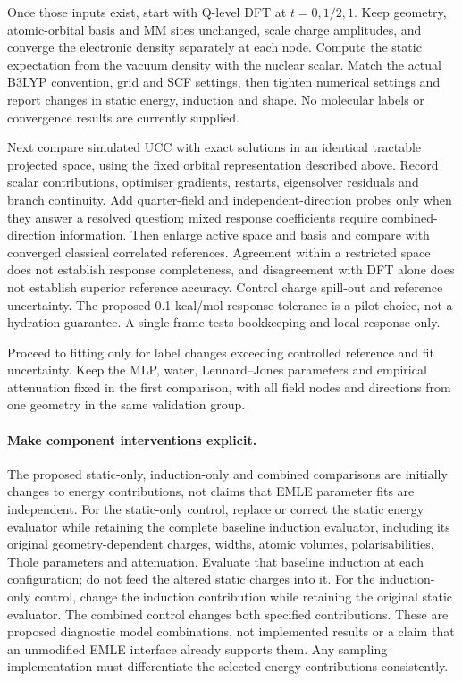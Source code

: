 \documentclass{article}
\begin{document}
Once those inputs exist, start with Q-level DFT at $t=0,1/2,1$. Keep geometry, atomic-orbital basis and MM sites unchanged, scale charge amplitudes, and converge the electronic density separately at each node. Compute the static expectation from the vacuum density with the nuclear scalar. Match the actual B3LYP convention, grid and SCF settings, then tighten numerical settings and report changes in static energy, induction and shape. No molecular labels or convergence results are currently supplied.

Next compare simulated UCC with exact solutions in an identical tractable projected space, using the fixed orbital representation described above. Record scalar contributions, optimiser gradients, restarts, eigensolver residuals and branch continuity. Add quarter-field and independent-direction probes only when they answer a resolved question; mixed response coefficients require combined-direction information. Then enlarge active space and basis and compare with converged classical correlated references. Agreement within a restricted space does not establish response completeness, and disagreement with DFT alone does not establish superior reference accuracy. Control charge spill-out and reference uncertainty. The proposed 0.1 kcal/mol response tolerance is a pilot choice, not a hydration guarantee. A single frame tests bookkeeping and local response only.

Proceed to fitting only for label changes exceeding controlled reference and fit uncertainty. Keep the MLP, water, Lennard--Jones parameters and empirical attenuation fixed in the first comparison, with all field nodes and directions from one geometry in the same validation group.

\paragraph{Make component interventions explicit.}
The proposed static-only, induction-only and combined comparisons are initially changes to energy contributions, not claims that EMLE parameter fits are independent. For the static-only control, replace or correct the static energy evaluator while retaining the complete baseline induction evaluator, including its original geometry-dependent charges, widths, atomic volumes, polarisabilities, Thole parameters and attenuation. Evaluate that baseline induction at each configuration; do not feed the altered static charges into it. For the induction-only control, change the induction contribution while retaining the original static evaluator. The combined control changes both specified contributions. These are proposed diagnostic model combinations, not implemented results or a claim that an unmodified EMLE interface already supports them. Any sampling implementation must differentiate the selected energy contributions consistently.
\end{document}

